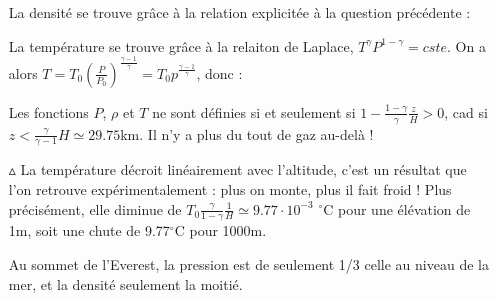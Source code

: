 \documentclass{report}
\begin{document}
\begin{itemize}
\noindent{}
	
	La densité se trouve grâce à la relation explicitée à la question précédente :
	
\noindent{}	
	
	La température se trouve grâce à la relaiton de Laplace, $T^\gamma P^{1-\gamma}=cste$. On a alors $T=T_0\left( \frac{P}{P_0}\right)^\frac{\gamma-1}{\gamma}=T_0p^\frac{\gamma-1}{\gamma}$, donc :
	 
	 	
\noindent{}

Les fonctions $P$, $\rho$ et $T$ ne sont définies si et seulement si $1-\frac{1-\gamma}{\gamma}\frac{z}{H}>0$, cad si $z<\frac{\gamma}{\gamma-1}H\simeq 29.75$km. Il n'y a plus du tout de gaz au-delà !

	\item[$\vartriangle$]  La température décroit linéairement avec l'altitude, c'est un résultat que l'on retrouve expérimentalement : plus on monte, plus il fait froid ! Plus précisément, elle diminue de $T_0\frac{\gamma}{1-\gamma}\frac{1}{H}\simeq9.77\cdot10^{-3}$ $^{\circ}$C pour une élévation de 1m, soit une chute de 9.77$^{\circ}$C pour 1000m. 
	
	Au sommet de l'Everest, la pression est de seulement 1/3 celle au niveau de la mer, et la densité seulement la moitié.
	

\end{itemize}
\end{document}
